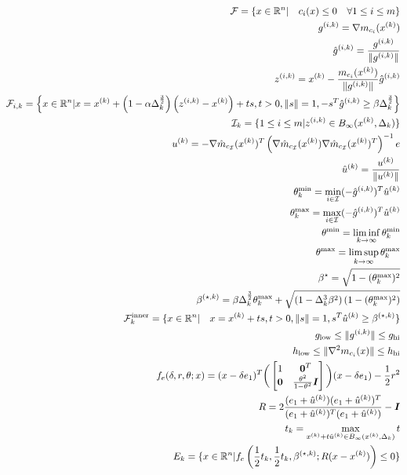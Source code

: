 \begin{align*}
{\mathcal F} = \{x \in {\mathbb R^{n}} | \quad c_i(x) \le 0\quad \forall 1 \le i \le m \} \\
{g^{(i, k)}} = \nabla m_{c_i}({x^{(k)}}) \\ 
{{\hat g}^{(i, k)}} = \frac{{g^{(i, k)}}}{\|{g^{(i, k)}}\|} \\
{z^{(i, k)}} = {x^{(k)}} - \frac{m_{c_i}({x^{(k)}})}{\|{g^{(i, k)}}\|}{{\hat g}^{(i, k)}} \\
{\mathcal F_{i, k}} = \left\{x \in {\mathbb R^{n}} | x = {x^{(k)}} + \left(1 - \alpha\Delta_k^{\frac 3 2}\right)\left({z^{(i, k)}} - {x^{(k)}}\right) + t s,t > 0, \|s\| = 1, -s^T{{\hat g}^{(i, k)}} \ge \beta \Delta_k^{\frac 3 2 }\right\} \\
{\mathcal I_{k}} = \{1\le i \le m | {z^{(i, k)}} \in B_{\infty}({x^{(k)}}, \Delta_k) \} \\
{u^{(k)}} = -\nabla \hat m_{c_{\mathcal I}}({x^{(k)}})^T\left(\nabla \hat m_{c_{\mathcal I}}({x^{(k)}})\nabla \hat m_{c_{\mathcal I}}({x^{(k)}})^T\right)^{-1} e\\
{{\hat u}^{(k)}} = \frac {{u^{(k)}}} {\| {u^{(k)}}\|}\\
\theta^{\text{min}}_k = \min_{i \in \mathcal I} (-{{\hat g}^{(i, k)}})^T {{\hat u}^{(k)}} \\
\theta^{\text{max}}_k = \max_{i \in \mathcal I} (-{{\hat g}^{(i, k)}})^T {{\hat u}^{(k)}} \\
\theta^{\text{min}} = \liminf_{k\to\infty} \theta^{\text{min}}_k\\
\theta^{\text{max}} = \limsup_{k\to\infty} \theta^{\text{max}}_k\\
{\beta^{\star}} = \sqrt{ 1 - (\theta^{\text{max}}_k)^2}\\
{\beta^{(\star, k)}} = \beta\Delta_k^{\frac 3 2} \theta^{\text{max}}_k + \sqrt{(1 - \Delta_k^3\beta^2)\left(1 - (\theta^{\text{max}}_k) ^2\right)} \\
{\mathcal {F}^{\text{inner}}_k} = \{x \in {\mathbb R^{n}} | \quad x = {x^{(k)}} + ts, t > 0, \|s\| = 1, s^T{{\hat u}^{(k)}} \ge {\beta^{(\star, k)}} \} \\
g_{\text{low}} \le \|{g^{(i, k)}}\| \le g_{\text{hi}} \\
h_{\text{low}} \le \|\nabla^2m_{c_i}(x)\| \le h_{\text{hi}} \\
f_e(\delta, r, \theta; x) = (x - \delta e_1)^T\bigg(\begin{bmatrix}
1 & \boldsymbol0^T \\
\boldsymbol 0 & \frac{\theta^2}{1 - \theta^2} \boldsymbol I \\
\end{bmatrix}\bigg)(x - \delta e_1) - \frac 1 2 r^2 \\
R = 2\frac{(e_1 + {{\hat u}^{(k)}})(e_1 + {{\hat u}^{(k)}})^T}{(e_1 + {{\hat u}^{(k)}})^T(e_1 + {{\hat u}^{(k)}})} - \boldsymbol I \\
t_k = \max_{{x^{(k)}} + t{{\hat u}^{(k)}} \in B_{\infty}({x^{(k)}}, \Delta_k)} t \\
E_k = \{x \in {\mathbb R^{n}} | f_e\left(\frac 1 2 t_k, \frac 1 2 t_k, {\beta^{(\star, k)}}; R(x - {x^{(k)}})\right) \le 0\}
\end{align*}


